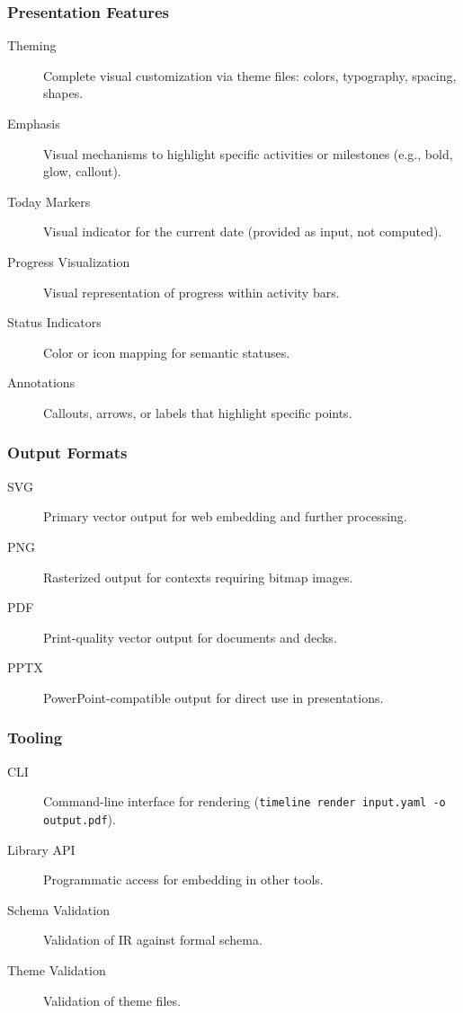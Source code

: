 \subsubsection{Presentation Features}

\begin{description}
  \item[Theming] Complete visual customization via theme files: colors, typography, spacing, shapes.
  
  \item[Emphasis] Visual mechanisms to highlight specific activities or milestones (e.g., bold, glow, callout).
  
  \item[Today Markers] Visual indicator for the current date (provided as input, not computed).
  
  \item[Progress Visualization] Visual representation of progress within activity bars.
  
  \item[Status Indicators] Color or icon mapping for semantic statuses.
  
  \item[Annotations] Callouts, arrows, or labels that highlight specific points.
\end{description}

\subsubsection{Output Formats}

\begin{description}
  \item[SVG] Primary vector output for web embedding and further processing.
  
  \item[PNG] Rasterized output for contexts requiring bitmap images.
  
  \item[PDF] Print-quality vector output for documents and decks.
  
  \item[PPTX] PowerPoint-compatible output for direct use in presentations.
\end{description}

\subsubsection{Tooling}

\begin{description}
  \item[CLI] Command-line interface for rendering (\texttt{timeline render input.yaml -o output.pdf}).
  
  \item[Library API] Programmatic access for embedding in other tools.
  
  \item[Schema Validation] Validation of IR against formal schema.
  
  \item[Theme Validation] Validation of theme files.
\end{description}

